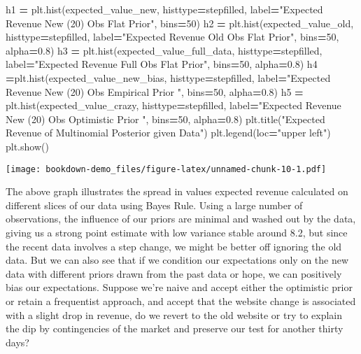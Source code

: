\documentclass[
]{book}
\newenvironment{Shaded}{\begin{snugshade}}{\end{snugshade}}
\newcommand{\DecValTok}[1]{\textcolor[rgb]{0.00,0.00,0.81}{#1}}
\newcommand{\FloatTok}[1]{\textcolor[rgb]{0.00,0.00,0.81}{#1}}
\newcommand{\NormalTok}[1]{#1}
\newcommand{\OperatorTok}[1]{\textcolor[rgb]{0.81,0.36,0.00}{\textbf{#1}}}
\newcommand{\StringTok}[1]{\textcolor[rgb]{0.31,0.60,0.02}{#1}}
\theoremstyle{definition}
\theoremstyle{definition}
\theoremstyle{definition}
\theoremstyle{remark}
\begin{document}
\begin{Shaded}
\begin{Highlighting}[]
\NormalTok{h1 }\OperatorTok{=}\NormalTok{ plt.hist(expected\_value\_new, histtype}\OperatorTok{=}\StringTok{\textquotesingle{}stepfilled\textquotesingle{}}\NormalTok{, label}\OperatorTok{=}\StringTok{"Expected Revenue New (20) Obs Flat Prior"}\NormalTok{, bins}\OperatorTok{=}\DecValTok{50}\NormalTok{)}
\NormalTok{h2 }\OperatorTok{=}\NormalTok{ plt.hist(expected\_value\_old, histtype}\OperatorTok{=}\StringTok{\textquotesingle{}stepfilled\textquotesingle{}}\NormalTok{, label}\OperatorTok{=}\StringTok{"Expected Revenue Old Obs Flat Prior"}\NormalTok{, bins}\OperatorTok{=}\DecValTok{50}\NormalTok{, alpha}\OperatorTok{=}\FloatTok{0.8}\NormalTok{)}
\NormalTok{h3 }\OperatorTok{=}\NormalTok{ plt.hist(expected\_value\_full\_data, histtype}\OperatorTok{=}\StringTok{\textquotesingle{}stepfilled\textquotesingle{}}\NormalTok{, label}\OperatorTok{=}\StringTok{"Expected Revenue Full Obs Flat Prior"}\NormalTok{, bins}\OperatorTok{=}\DecValTok{50}\NormalTok{, alpha}\OperatorTok{=}\FloatTok{0.8}\NormalTok{)}
\NormalTok{h4 }\OperatorTok{=}\NormalTok{plt.hist(expected\_value\_new\_bias, histtype}\OperatorTok{=}\StringTok{\textquotesingle{}stepfilled\textquotesingle{}}\NormalTok{, label}\OperatorTok{=}\StringTok{"Expected Revenue New (20) Obs Empirical Prior "}\NormalTok{, bins}\OperatorTok{=}\DecValTok{50}\NormalTok{, alpha}\OperatorTok{=}\FloatTok{0.8}\NormalTok{)}
\NormalTok{h5 }\OperatorTok{=}\NormalTok{ plt.hist(expected\_value\_crazy, histtype}\OperatorTok{=}\StringTok{\textquotesingle{}stepfilled\textquotesingle{}}\NormalTok{, label}\OperatorTok{=}\StringTok{"Expected Revenue New (20) Obs Optimistic Prior "}\NormalTok{, bins}\OperatorTok{=}\DecValTok{50}\NormalTok{, alpha}\OperatorTok{=}\FloatTok{0.8}\NormalTok{)}
\NormalTok{plt.title(}\StringTok{"Expected Revenue of Multinomial Posterior given Data"}\NormalTok{)}
\NormalTok{plt.legend(loc}\OperatorTok{=}\StringTok{"upper left"}\NormalTok{)}
\NormalTok{plt.show()}
\end{Highlighting}
\end{Shaded}

\texttt{[image: bookdown-demo\_files/figure-latex/unnamed-chunk-10-1.pdf]}

The above graph illustrates the spread in values expected revenue calculated on different slices of our data using Bayes Rule. Using a large number of observations, the influence of our priors are minimal and washed out by the data, giving us a strong point estimate with low variance stable around 8.2, but since the recent data involves a step change, we might be better off ignoring the old data. But we can also see that if we condition our expectations only on the new data with different priors drawn from the past data or hope, we can positively bias our expectations. Suppose we're naive and accept either the optimistic prior or retain a frequentist approach, and accept that the website change is associated with a slight drop in revenue, do we revert to the old website or try to explain the dip by contingencies of the market and preserve our test for another thirty days?
\end{document}
